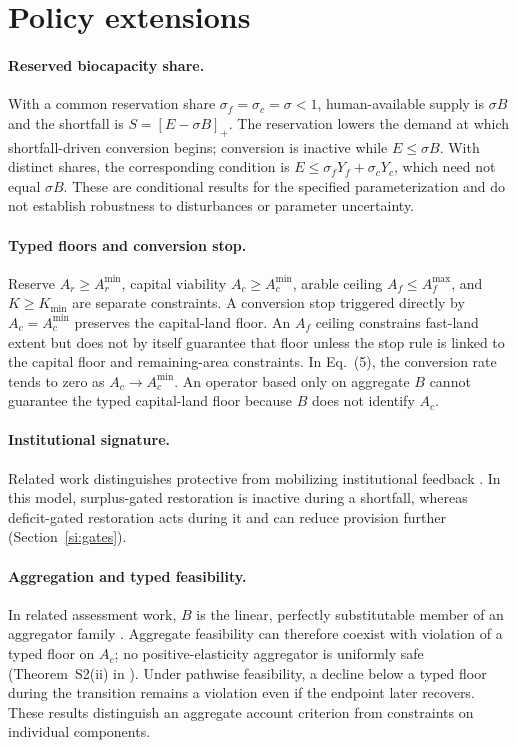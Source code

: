 \documentclass[11pt,a4paper]{article}
\newcommand{\Acmin}{A_c^{\min}}
\begin{document}
\section{Policy extensions}\label{si:policy}

\paragraph{Reserved biocapacity share.} With a common reservation share $\sigma_f=\sigma_c=\sigma<1$, human-available supply is $\sigma B$ and the shortfall is $S=[E-\sigma B]_+$. The reservation lowers the demand at which shortfall-driven conversion begins; conversion is inactive while $E\le\sigma B$. With distinct shares, the corresponding condition is $E\le\sigma_fY_f+\sigma_cY_c$, which need not equal $\sigma B$. These are conditional results for the specified parameterization and do not establish robustness to disturbances or parameter uncertainty.

\paragraph{Typed floors and conversion stop.} Reserve $A_r\ge A_r^{\min}$, capital viability $A_c\ge\Acmin$, arable ceiling $A_f\le A_f^{\max}$, and $K\ge K_{\min}$ are separate constraints. A conversion stop triggered directly by $A_c=\Acmin$ preserves the capital-land floor. An $A_f$ ceiling constrains fast-land extent but does not by itself guarantee that floor unless the stop rule is linked to the capital floor and remaining-area constraints. In Eq.~(5), the conversion rate tends to zero as $A_c\to\Acmin$. An operator based only on aggregate $B$ cannot guarantee the typed capital-land floor because $B$ does not identify $A_c$.

\paragraph{Institutional signature.} Related work distinguishes protective from mobilizing institutional feedback \citep{Abaee2026a}. In this model, surplus-gated restoration is inactive during a shortfall, whereas deficit-gated restoration acts during it and can reduce provision further (Section~\ref{si:gates}).

\paragraph{Aggregation and typed feasibility.} In related assessment work, $B$ is the linear, perfectly substitutable member of an aggregator family \citep[Lemma~A of][]{Abaee2026b}. Aggregate feasibility can therefore coexist with violation of a typed floor on $A_c$; no positive-elasticity aggregator is uniformly safe (Theorem~S2(ii) in \citet{Abaee2026b}). Under pathwise feasibility, a decline below a typed floor during the transition remains a violation even if the endpoint later recovers. These results distinguish an aggregate account criterion from constraints on individual components.
\end{document}
